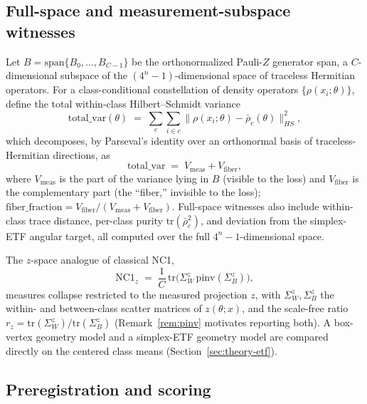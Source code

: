 \documentclass[pdflatex,sn-mathphys-ay]{sn-jnl}
\theoremstyle{thmstyleone}
\theoremstyle{thmstyletwo}
\begin{document}
\subsection{Full-space and measurement-subspace witnesses}
\label{sec:witnesses}

Let $B = \mathrm{span}\{B_0,\ldots,B_{C-1}\}$ be the orthonormalized Pauli-$Z$ generator span, a $C$-dimensional subspace of the $(4^n{-}1)$-dimensional space of traceless Hermitian operators. For a class-conditional constellation of density operators $\{\rho(x_i;\theta)\}$, define the total within-class Hilbert--Schmidt variance
\begin{equation}
\mathrm{total\_var}(\theta) \;=\; \sum_{c} \sum_{i \in c} \big\| \rho(x_i;\theta) - \bar\rho_c(\theta) \big\|_{HS}^2 ,
\label{eq:totalvar}
\end{equation}
which decomposes, by Parseval's identity over an orthonormal basis of traceless-Hermitian directions, as
\begin{equation}
\mathrm{total\_var} \;=\; V_{\mathrm{meas}} + V_{\mathrm{fiber}},
\label{eq:decomp}
\end{equation}
where $V_{\mathrm{meas}}$ is the part of the variance lying in $B$ (visible to the loss) and $V_{\mathrm{fiber}}$ is the complementary part (the ``fiber,'' invisible to the loss); $\mathrm{fiber\_fraction} = V_\mathrm{fiber}/(V_\mathrm{meas}+V_\mathrm{fiber})$. Full-space witnesses also include within-class trace distance, per-class purity $\mathrm{tr}(\bar\rho_c^2)$, and deviation from the simplex-ETF angular target, all computed over the full $4^n-1$-dimensional space.

The $z$-space analogue of classical NC1,
\begin{equation}
\mathrm{NC1}_z \;=\; \frac{1}{C}\,\mathrm{tr}\!\big(\Sigma_W^z \, \mathrm{pinv}(\Sigma_B^z)\big),
\label{eq:nc1z}
\end{equation}
measures collapse restricted to the measured projection $z$, with $\Sigma_W^z,\Sigma_B^z$ the within- and between-class scatter matrices of $z(\theta;x)$, and the scale-free ratio $r_z = \mathrm{tr}(\Sigma_W^z)/\mathrm{tr}(\Sigma_B^z)$ (Remark~\ref{rem:pinv} motivates reporting both). A box-vertex geometry model and a simplex-ETF geometry model are compared directly on the centered class means (Section~\ref{sec:theory-etf}).

\subsection{Preregistration and scoring}
\label{sec:prereg}
\end{document}
